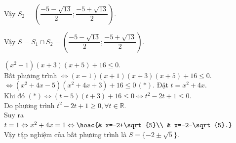 \begin{bt}
{\begin{listEX}[1]
\begin{itemize}
\\
				Vậy $ S_2=\left(\dfrac{-5-\sqrt{13}}{2}; \dfrac{-5+\sqrt{13}}{2}\right)  $.
			\end{itemize}
			Vậy $ S=S_1 \cap S_2=\left(\dfrac{-5-\sqrt{13}}{2}; \dfrac{-5+\sqrt{13}}{2}\right) $.
			\item $ \left(x^{2}-1\right)(x+3)(x+5)+16 \leq 0 $.\\
			Bất phương trình $ \Leftrightarrow (x-1)(x+1)(x+3)(x+5) +16\leq 0 $.\\
			$ \Leftrightarrow (x^2+4x-5)(x^2+4x+3) +16 \leq 0\, (\ast)$. Đặt $ t=x^2+4x $.\\
			Khi đó $ (\ast) \Leftrightarrow (t-5)(t+3)+16 \leq 0 \Leftrightarrow t^2 -2t +1 \leq 0$.\\
			Do phương trình $ t^2 -2t +1\geq 0, \forall t \in \mathbb{R} $.\\
			Suy ra $ t=1 \Leftrightarrow x^2+4x=1 \Leftrightarrow \hoac{& x=-2+\sqrt{5}\\ & x=-2-\sqrt{5}.}$\\
			Vậy tập nghiệm của bất phương trình là $ S=\{-2\pm \sqrt{5}\} $.
		\end{listEX}
		
	}
\end{bt}

